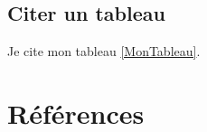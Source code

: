 \documentclass[11pt,a4paper]{article}
\begin{document}
\subsection{Citer un tableau}
Je cite mon tableau \ref{MonTableau}.


\section{Références}

\end{document}
